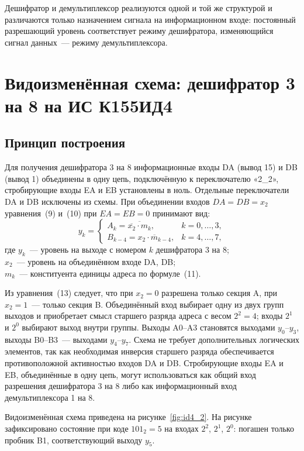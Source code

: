 \documentclass[14pt,a4paper]{extarticle}
\newcommand{\inv}[1]{\overline{#1}}
\begin{document}
Дешифратор и демультиплексор реализуются одной и той же структурой и различаются только назначением сигнала на информационном входе: постоянный разрешающий уровень соответствует режиму дешифратора, изменяющийся сигнал данных~--- режиму демультиплексора.

\section{Видоизменённая схема: дешифратор 3 на 8 на ИС К155ИД4}

\subsection{Принцип построения}

Для получения дешифратора 3 на 8 информационные входы DA (вывод 15) и DB (вывод 1) объединены в одну цепь, подключённую к переключателю «2\_2», стробирующие входы EA и EB установлены в ноль. Отдельные переключатели DA и DB исключены из схемы. При объединении входов $DA = DB = x_2$ уравнения~(9) и~(10) при $EA = EB = 0$ принимают вид:
\begin{equation}
y_k =
\begin{cases}
A_k = \inv{\inv{x_2} \cdot m_k}, & k = 0, \ldots, 3,\\
B_{k-4} = \inv{x_2 \cdot m_{k-4}}, & k = 4, \ldots, 7,
\end{cases}
\end{equation}
\noindent где $y_k$~--- уровень на выходе с номером $k$ дешифратора 3 на 8;\\
$x_2$~--- уровень на объединённом входе DA, DB;\\
$m_k$~--- конституента единицы адреса по формуле~(11).

Из уравнения~(13) следует, что при $x_2 = 0$ разрешена только секция A, при $x_2 = 1$~--- только секция B. Объединённый вход выбирает одну из двух групп выходов и приобретает смысл старшего разряда адреса с весом $2^2 = 4$; входы $2^1$ и $2^0$ выбирают выход внутри группы. Выходы A0--A3 становятся выходами $y_0$--$y_3$, выходы B0--B3~--- выходами $y_4$--$y_7$. Схема не требует дополнительных логических элементов, так как необходимая инверсия старшего разряда обеспечивается противоположной активностью входов DA и DB. Стробирующие входы EA и EB, объединённые в одну цепь, могут использоваться как общий вход разрешения дешифратора 3 на 8 либо как информационный вход демультиплексора 1 на 8.

Видоизменённая схема приведена на рисунке~\ref{fig:id4_2}. На рисунке зафиксировано состояние при коде $101_2 = 5$ на входах $2^2$, $2^1$, $2^0$: погашен только пробник B1, соответствующий выходу $y_5$.
\end{document}
